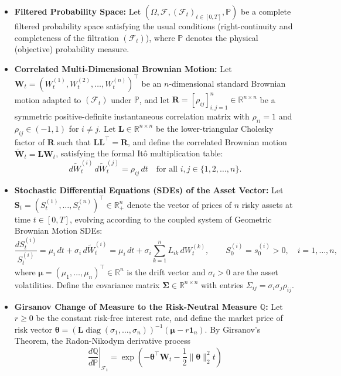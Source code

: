 \documentclass[11pt, letterpaper]{article}
\theoremstyle{definition}
\theoremstyle{remark}
\newcommand{\R}{\mathbb{R}}
\newcommand{\Prob}{\mathbb{P}}
\newcommand{\F}{\mathcal{F}}
\begin{document}
\begin{itemize}
    \item \textbf{Filtered Probability Space:} Let $(\Omega, \F, (\F_t)_{t \in [0, T]}, \Prob)$ be a complete filtered probability space satisfying the usual conditions (right-continuity and completeness of the filtration $(\F_t)$), where $\Prob$ denotes the physical (objective) probability measure.
    \item \textbf{Correlated Multi-Dimensional Brownian Motion:} Let $\mathbf{W}_t = (W_t^{(1)}, W_t^{(2)}, \dots, W_t^{(n)})^\top$ be an $n$-dimensional standard Brownian motion adapted to $(\F_t)$ under $\Prob$, and let $\mathbf{R} = [\rho_{ij}]_{i,j=1}^n \in \R^{n \times n}$ be a symmetric positive-definite instantaneous correlation matrix with $\rho_{ii} = 1$ and $\rho_{ij} \in (-1, 1)$ for $i \neq j$. Let $\mathbf{L} \in \R^{n \times n}$ be the lower-triangular Cholesky factor of $\mathbf{R}$ such that $\mathbf{L}\mathbf{L}^\top = \mathbf{R}$, and define the correlated Brownian motion $\widetilde{\mathbf{W}}_t = \mathbf{L}\mathbf{W}_t$, satisfying the formal It\^{o} multiplication table:
    \[
    d\widetilde{W}_t^{(i)}\, d\widetilde{W}_t^{(j)} = \rho_{ij}\, dt \quad \text{for all } i, j \in \{1, 2, \dots, n\}.
    \]
    \item \textbf{Stochastic Differential Equations (SDEs) of the Asset Vector:} Let $\mathbf{S}_t = (S_t^{(1)}, \dots, S_t^{(n)})^\top \in \R_+^n$ denote the vector of prices of $n$ risky assets at time $t \in [0, T]$, evolving according to the coupled system of Geometric Brownian Motion SDEs:
    \[
    \frac{dS_t^{(i)}}{S_t^{(i)}} = \mu_i\, dt + \sigma_i\, d\widetilde{W}_t^{(i)} = \mu_i\, dt + \sigma_i \sum_{k=1}^{n} L_{ik}\, dW_t^{(k)}, \qquad S_0^{(i)} = s_0^{(i)} > 0, \quad i = 1, \dots, n,
    \]
    where $\boldsymbol{\mu} = (\mu_1, \dots, \mu_n)^\top \in \R^n$ is the drift vector and $\sigma_i > 0$ are the asset volatilities. Define the covariance matrix $\boldsymbol{\Sigma} \in \R^{n \times n}$ with entries $\Sigma_{ij} = \sigma_i \sigma_j \rho_{ij}$.
    \item \textbf{Girsanov Change of Measure to the Risk-Neutral Measure $\mathbb{Q}$:} Let $r \ge 0$ be the constant risk-free interest rate, and define the market price of risk vector $\boldsymbol{\theta} = (\mathbf{L}\operatorname{diag}(\sigma_1, \dots, \sigma_n))^{-1}(\boldsymbol{\mu} - r\mathbf{1}_n)$. By Girsanov's Theorem, the Radon-Nikodym derivative process
    \[
    \left.\frac{d\mathbb{Q}}{d\Prob}\right|_{\F_t} = \exp\left(-\boldsymbol{\theta}^\top \mathbf{W}_t - \frac{1}{2}\|\boldsymbol{\theta}\|_2^2 t\right)
\]
\end{itemize}
\end{document}
